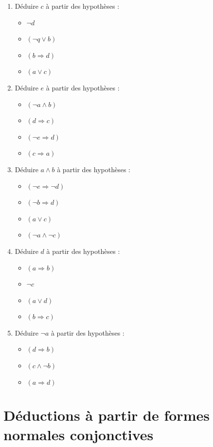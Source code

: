 \documentclass[a4paper,11pt]{article}
\begin{document}
\begin{enumerate}
\item Déduire $c$ à partir des hypothèses :
\begin{itemize}
\item $\neg d$
\item $(\neg q \vee b)$
\item $(b \Rightarrow d)$
\item $(a \vee c)$
\end{itemize}

\item Déduire $e$ à partir des hypothèses :
\begin{itemize}
\item $(\neg a \wedge b)$
\item $(d \Rightarrow c)$
\item $(\neg e \Rightarrow d)$
\item $(c \Rightarrow a)$
\end{itemize}

\item Déduire $a \wedge b$ à partir des hypothèses :
\begin{itemize}
\item $(\neg e \Rightarrow \neg d)$
\item $(\neg b \Rightarrow d)$
\item $(a \vee c)$
\item $(\neg a \wedge \neg c)$
\end{itemize}

\item Déduire $d$ à partir des hypothèses :
\begin{itemize}
\item $(a \Rightarrow b)$
\item $\neg c$
\item $(a \vee d)$
\item $(b \Rightarrow c)$
\end{itemize}

\item Déduire $\neg a$ à partir des hypothèses :
\begin{itemize}
\item $(d \Rightarrow b)$
\item $(c \wedge \neg b)$
\item $(a \Rightarrow d)$
\end{itemize}
\end{enumerate}

\section{Déductions à partir de formes normales conjonctives}
\end{document}
